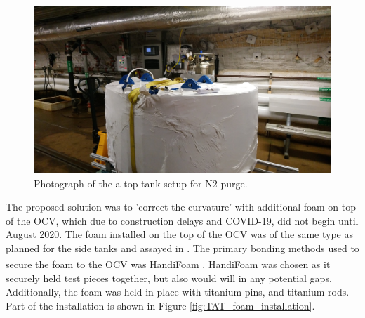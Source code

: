 \begin{figure}[!htbp]
\includegraphics[width=\textwidth]{Figures/Construction/tat_purging.JPG}
\centering
\caption{Photograph of the a top tank setup for N2 purge.}
\label{fig:TAT_purging}
\end{figure}

\par
The proposed solution was to 'correct the curvature' with additional foam on top of the OCV, which due to construction delays and COVID-19, did not begin until August 2020.
The foam installed on the top of the OCV was of the same type as planned for the side tanks and assayed in \cite{LZ_assay_ref}.
The primary bonding methods used to secure the foam to the OCV was HandiFoam\textsuperscript{\textregistered} \cite{handifoam_ref}.
HandiFoam\textsuperscript{\textregistered} was chosen as it securely held test pieces together, but also would will in any potential gaps.
Additionally, the foam was held in place with titanium pins, and titanium rods.
Part of the installation is shown in Figure \ref{fig:TAT_foam_installation}.

